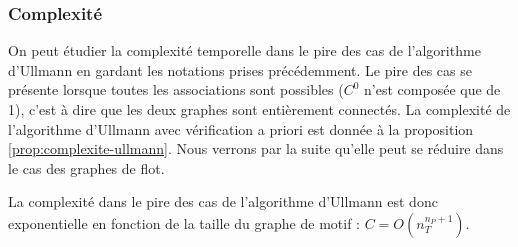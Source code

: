 



\subsubsection{Complexité \label{sec:ullmann_complexite}}
On peut étudier la complexité temporelle dans le pire des cas de l'algorithme d'Ullmann en gardant les notations prises précédemment.
Le pire des cas se présente lorsque toutes les associations sont possibles \cite{MessPhd} ($C^0$ n'est composée que de 1), c'est à dire que les deux graphes sont entièrement connectés. La complexité de l'algorithme d'Ullmann avec vérification a priori est donnée à la proposition \ref{prop:complexite-ullmann}.
Nous verrons par la suite qu'elle peut se réduire dans le cas des graphes de flot.

\begin{prop}
La complexité dans le pire des cas de l'algorithme d'Ullmann est donc exponentielle en fonction de la taille du graphe de motif : $C=O(n_T^{n_P+1})$.
\label{prop:complexite-ullmann}
\end{prop}

